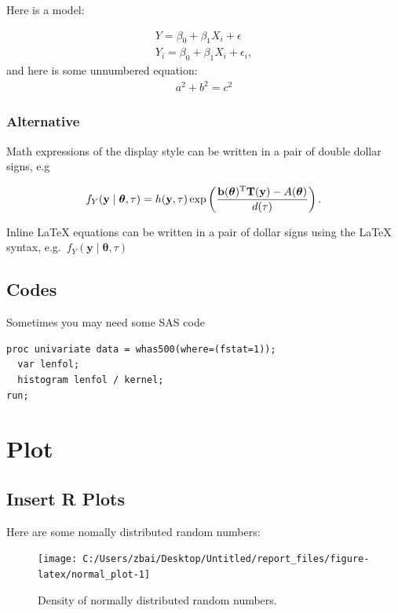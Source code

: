 \documentclass[oneside, 12pt, a4paper]{article}
\begin{document}
Here is a model:

\begin{align}
Y = \beta_0 + \beta_1 X_i + \epsilon \\
Y_i = \beta_0 + \beta_1 X_i + \epsilon_i ,
\end{align} and here is some unnumbered equation: \begin{align*}
a^2 + b^2 = c^2
\end{align*}

\hypertarget{alternative}{%
\subsubsection{Alternative}\label{alternative}}

Math expressions of the display style can be written in a pair of double
dollar signs, e.g

\[{\displaystyle f_{Y}(\mathbf {y} \mid {\boldsymbol {\theta }},\tau )=h(\mathbf {y} ,\tau )\exp \left({\frac {\mathbf {b} ({\boldsymbol {\theta }})^{\rm {T}}\mathbf {T} (\mathbf {y} )-A({\boldsymbol {\theta }})}{d(\tau )}}\right).\,\!}\]

Inline LaTeX equations can be written in a pair of dollar signs using
the LaTeX syntax,
e.g.~\({\displaystyle f_{Y}(\mathbf {y} \mid {\boldsymbol {\theta }},\tau )}\)

\hypertarget{codes}{%
\subsection{Codes}\label{codes}}

Sometimes you may need some SAS code

\begin{verbatim}
proc univariate data = whas500(where=(fstat=1));
  var lenfol;
  histogram lenfol / kernel;
run;
\end{verbatim}

\hypertarget{plot}{%
\section{Plot}\label{plot}}

\hypertarget{insert-r-plots}{%
\subsection{Insert R Plots}\label{insert-r-plots}}

Here are some nomally distributed random numbers:

\begin{figure}[H]

{\centering \texttt{[image: C:/Users/zbai/Desktop/Untitled/report\_files/figure-latex/normal\_plot-1]} 

}

\caption{\label{fig:fig1}Density of normally distributed random numbers.}\label{fig:normal_plot}
\end{figure}
\end{document}
